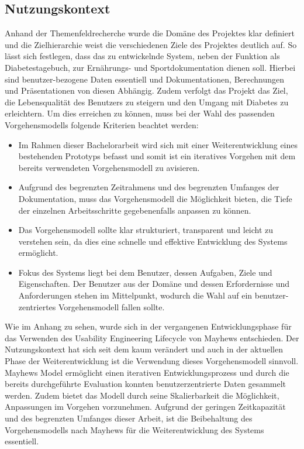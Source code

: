 \documentclass[a4paper,11pt]{article}%
\renewcommand{\\}{\vspace*{0.5\baselineskip} \newline}
\begin{document}
	\subsection{Nutzungskontext}
		Anhand der Themenfeldrecherche wurde die Domäne des Projektes klar definiert und die Zielhierarchie weist die verschiedenen Ziele des Projektes deutlich auf. So lässt sich festlegen, dass das zu entwickelnde System, neben der Funktion als Diabetestagebuch, zur Ernährungs- und Sportdokumentation dienen soll. Hierbei sind benutzer-bezogene Daten essentiell und Dokumentationen, Berechnungen und Präsentationen von diesen Abhängig. Zudem verfolgt das Projekt das Ziel, die Lebensqualität des Benutzers zu steigern und den Umgang mit Diabetes zu erleichtern. \newline
		Um dies erreichen zu können, muss bei der Wahl des passenden Vorgehensmodells folgende Kriterien beachtet werden:
		\begin{itemize}
			\item Im Rahmen dieser Bachelorarbeit wird sich mit einer Weiterentwicklung eines bestehenden Prototyps befasst und somit ist ein iteratives Vorgehen mit dem bereits verwendeten Vorgehensmodell zu avisieren.
			\item Aufgrund des begrenzten Zeitrahmens und des begrenzten Umfanges der Dokumentation, muss das Vorgehensmodell die Möglichkeit bieten, die Tiefe der einzelnen Arbeitsschritte gegebenenfalls anpassen zu können.
			\item Das Vorgehensmodell sollte klar strukturiert, transparent und leicht zu verstehen sein, da dies eine schnelle und effektive Entwicklung des Systems ermöglicht.
			\item Fokus des Systems liegt bei dem Benutzer, dessen Aufgaben, Ziele und Eigenschaften. Der Benutzer aus der Domäne und dessen Erfordernisse und Anforderungen stehen im Mittelpunkt, wodurch die Wahl auf ein benutzer-zentriertes Vorgehensmodell fallen sollte.
		\end{itemize}
		Wie im Anhang zu sehen, wurde sich in der vergangenen Entwicklungsphase für das Verwenden des Usability Engineering Lifecycle von Mayhews entschieden. Der Nutzungskontext hat sich seit dem kaum verändert und auch in der aktuellen Phase der Weiterentwicklung ist die Verwendung dieses Vorgehensmodell sinnvoll. Mayhews Model ermöglicht einen iterativen Entwicklungsprozess und durch die bereits durchgeführte Evaluation konnten benutzerzentrierte Daten gesammelt werden. Zudem bietet das Modell durch seine Skalierbarkeit die Möglichkeit, Anpassungen im Vorgehen vorzunehmen. Aufgrund der geringen Zeitkapazität und des begrenzten Umfanges dieser Arbeit, ist die Beibehaltung des Vorgehensmodells nach Mayhews für die Weiterentwicklung des Systems essentiell.
\newpage
\end{document}
